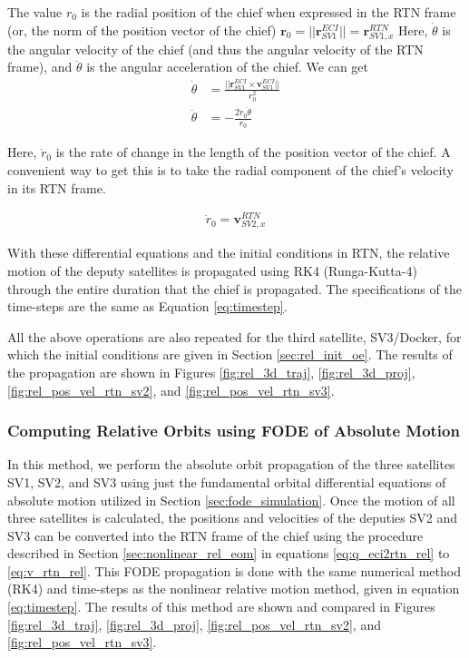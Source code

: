 The value $r_0$ is the radial position of the chief when expressed in the RTN frame (or, the norm of the position vector of the chief) $\boldsymbol{r}_0 = ||\boldsymbol{r}^{ECI}_{SV1}|| = \boldsymbol{r}^{RTN}_{SV1, x}$ 
Here, $\dot{\theta}$ is the angular velocity of the chief (and thus the angular velocity of the RTN frame), and $\ddot{\theta}$ is the angular acceleration of the chief. We can get 
\begin{align}
    \dot{\theta} &= \frac{{||\boldsymbol{r}_{SV1}^{ECI} \times \boldsymbol{v}_{SV1}^{ECI}||}}{r_0^2} \\
    \ddot{\theta} &= -\frac{2\dot{r}_0\dot{\theta}}{r_0}
\end{align}

Here, $\dot{r}_0$ is the rate of change in the length of the position vector of the chief. A convenient way to get this is to take the radial component of the chief's velocity in its RTN frame.

\begin{align}
    \dot{r}_0 = \boldsymbol{v}^{RTN}_{SV2, x}
\end{align}

With these differential equations and the initial conditions in RTN, the relative motion of the deputy satellites is propagated using RK4 (Runga-Kutta-4) through the entire duration that the chief is propagated. The specifications of the time-steps are the same as Equation \ref{eq:timestep}.

All the above operations are also repeated for the third satellite, SV3/Docker, for which the initial conditions are given in Section \ref{sec:rel_init_oe}.
The results of the propagation are shown in Figures \ref{fig:rel_3d_traj}, \ref{fig:rel_3d_proj}, \ref{fig:rel_pos_vel_rtn_sv2}, and \ref{fig:rel_pos_vel_rtn_sv3}.

\subsubsection{Computing Relative Orbits using FODE of Absolute Motion}

In this method, we perform the absolute orbit propagation of the three satellites SV1, SV2, and SV3 using just the fundamental orbital differential equations of absolute motion utilized in Section \ref{sec:fode_simulation}. Once the motion of all three satellites is calculated, the positions and velocities of the deputies SV2 and SV3 can be converted into the RTN frame of the chief using the procedure described in Section \ref{sec:nonlinear_rel_eom} in equations \ref{eq:q_eci2rtn_rel} to \ref{eq:v_rtn_rel}. This FODE propagation is done with the same numerical method (RK4) and time-steps as the nonlinear relative motion method, given in equation \ref{eq:timestep}. The results of this method are shown and compared in Figures \ref{fig:rel_3d_traj}, \ref{fig:rel_3d_proj}, \ref{fig:rel_pos_vel_rtn_sv2}, and \ref{fig:rel_pos_vel_rtn_sv3}.

